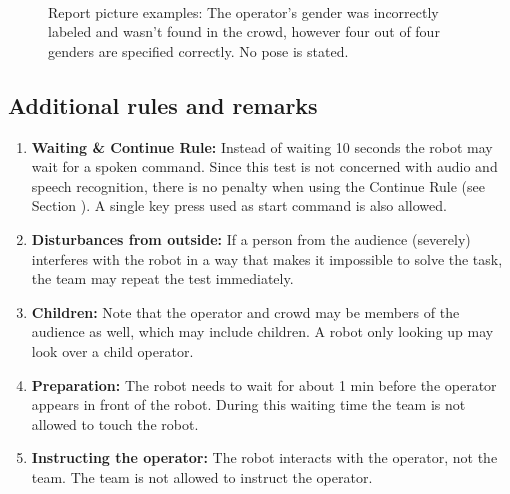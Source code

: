 \begin{figure}[tbp]
  \centering
   ~ 
  \caption{Report picture examples: The operator's gender was incorrectly labeled and wasn't found in the crowd, however four out of four genders are specified correctly. No pose is stated.}
  \label{fig:person_recognition}
\end{figure}

\subsection{Additional rules and remarks}
\begin{enumerate}
\item \textbf{Waiting \& Continue Rule:} Instead of waiting 10 seconds the robot may wait for a spoken command. Since this test is not concerned with audio and speech recognition, there is no penalty when using the Continue Rule (see Section ). A single key press used as start command is also allowed.
\item \textbf{Disturbances from outside:} If a person from the audience (severely) interferes with the robot in a way that makes it impossible to solve the task, the team may repeat the test immediately.
\item \textbf{Children:} Note that the operator and crowd may be members of the audience as well, which may include children. A robot only looking up may look over a child operator. 
\item \textbf{Preparation:} The robot needs to wait for about 1 min before the operator appears in front of the robot. During this waiting time the team is not allowed to touch the robot.
\item \textbf{Instructing the operator:} The robot interacts with the operator, not the team. The team is not allowed to instruct the operator.
\end{enumerate}

